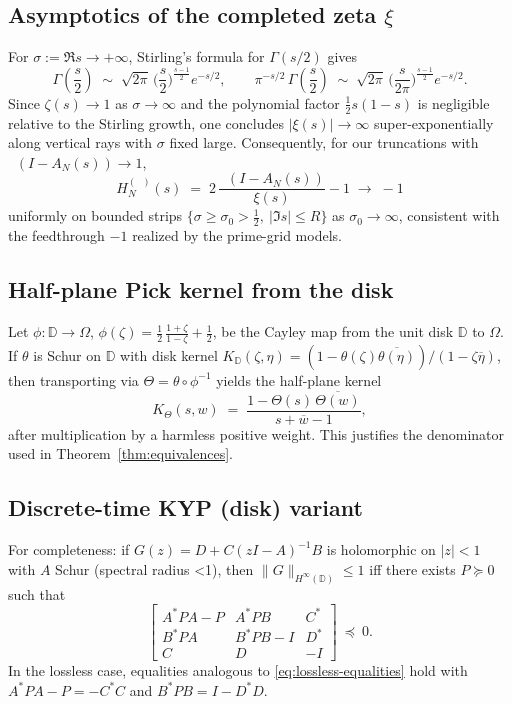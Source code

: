 \documentclass[11pt]{article}
\theoremstyle{remark}
\DeclareMathOperator{\dettwo}{det_2}
\begin{document}
\subsection{Asymptotics of the completed zeta \(\xi\)}\label{app:xi-asymptotics}
For \(\sigma:=\Re s\to+\infty\), Stirling's formula for \(\Gamma(s/2)\) gives
\[
 \Gamma\!\left(\frac{s}{2}\right)\;\sim\;\sqrt{2\pi}\,\Big(\frac{s}{2}\Big)^{\frac{s-1}{2}} e^{-s/2},\qquad \pi^{-s/2}\,\Gamma\!\left(\frac{s}{2}\right)\;\sim\;\sqrt{2\pi}\,\Big(\frac{s}{2\pi}\Big)^{\frac{s-1}{2}} e^{-s/2}.
\]
Since \(\zeta(s)\to 1\) as \(\sigma\to\infty\) and the polynomial factor \(\tfrac12 s(1-s)\) is negligible relative to the Stirling growth, one concludes \(|\xi(s)|\to\infty\) super-exponentially along vertical rays with \(\sigma\) fixed large. Consequently, for our truncations with \(\dettwo(I-A_N(s))\to 1\),
\[
 H_N^{(\dettwo)}(s)\;=\;2\,\frac{\dettwo(I-A_N(s))}{\xi(s)}-1\;\longrightarrow\;-1
\]
uniformly on bounded strips \(\{\sigma\ge \sigma_0>\tfrac12,\ |\Im s|\le R\}\) as \(\sigma_0\to\infty\), consistent with the feedthrough \(-1\) realized by the prime-grid models.

\subsection{Half-plane Pick kernel from the disk}
Let \(\phi:\mathbb D\to\Omega\), \(\phi(\zeta)=\tfrac12\,\frac{1+\zeta}{1-\zeta}+\tfrac12\), be the Cayley map from the unit disk \(\mathbb D\) to \(\Omega\). If \(\theta\) is Schur on \(\mathbb D\) with disk kernel \(K_{\mathbb D}(\zeta,\eta)=(1-\theta(\zeta)\overline{\theta(\eta)})/(1-\zeta\overline{\eta})\), then transporting via \(\Theta=\theta\circ\phi^{-1}\) yields the half-plane kernel
\[
 K_\Theta(s,w)\;=\;\frac{1-\Theta(s)\,\overline{\Theta(w)}}{s+\overline{w}-1},
\]
after multiplication by a harmless positive weight. This justifies the denominator used in Theorem~\ref{thm:equivalences}.

\subsection{Discrete-time KYP (disk) variant}
For completeness: if \(G(z)=D+C(zI-A)^{-1}B\) is holomorphic on \(|z|<1\) with \(A\) Schur (spectral radius <1), then \(\|G\|_{H^\infty(\mathbb D)}\le 1\) iff there exists \(P\succeq 0\) such that
\[
 \begin{bmatrix}
  A^*PA-P & A^*PB & C^*\\
  B^*PA & B^*PB-I & D^*\\
  C & D & -I
 \end{bmatrix}\ \preceq\ 0.
\]
In the lossless case, equalities analogous to \eqref{eq:lossless-equalities} hold with \(A^*PA-P=-C^*C\) and \(B^*PB=I-D^*D\).
\end{document}
